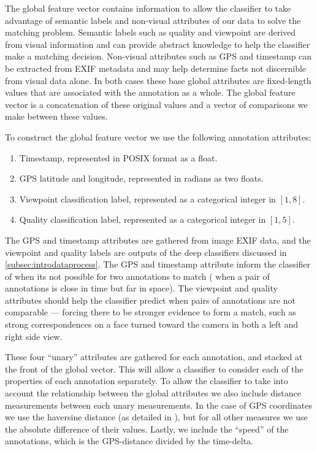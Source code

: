 The global feature vector contains information to allow the classifier to take
  advantage of semantic labels and non-visual attributes of our data to solve
  the matching problem.
Semantic labels such as quality and viewpoint are derived from visual
  information and can provide abstract knowledge to help the classifier make a
  matching decision.
Non-visual attributes such as GPS and timestamp can be extracted from EXIF
  metadata and may help determine facts not discernible from visual data alone.
In both cases these base global attributes are fixed-length values that are
  associated with the annotation as a whole.
The global feature vector is a concatenation of these original values and a
  vector of comparisons we make between these values.

\newcommand{\nan}{\text{NaN}}

To construct the global feature vector we use the following annotation attributes:
\begin{enumerate}[label={(\arabic*)}]

    \item Timestamp, represented in POSIX format as a float.

    \item GPS latitude and longitude, represented in radians as two floats. 

    \item Viewpoint classification label, represented as a categorical integer in $[1,8]$.

    \item Quality classification label, represented as a categorical integer
      in $[1,5]$.
\end{enumerate}
The GPS and timestamp attributes are gathered from image EXIF data, and the
  viewpoint and quality labels are outputs of the deep classifiers discussed in
  \cref{subsec:introdataprocess}.
The GPS and timestamp attribute inform the classifier of when its not possible
  for two annotations to match (\eg{} when a pair of annotations is close in
  time but far in space).
The viewpoint and quality attributes should help the classifier predict when
  pairs of annotations are not comparable --- forcing there to be stronger
  evidence to form a match, such as strong correspondences on a face turned
  toward the camera in both a left and right side view.


These four ``unary'' attributes are gathered for each annotation, and stacked
  at the front of the global vector.
This will allow a classifier to consider each of the properties of each
  annotation separately.
To allow the classifier to take into account the relationship between the
  global attributes we also include distance measurements between each unary
  measurements.
In the case of GPS coordinates we use the haversine distance (as detailed in
  ), but for all other measures we use the absolute
  difference of their values.
Lastly, we include the ``speed'' of the annotations, which is the GPS-distance
  divided by the time-delta.


